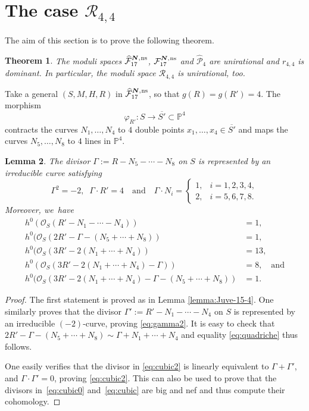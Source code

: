 \documentclass[JEP,XML,SOM,Unicode,NoEqCountersInSection,published]{cedram}
\newcommand{\quand}{\quad\text{and}\quad}
\newcommand{\ns}{{\mkern1mu\mathrm{ns}}}
\newcommand{\bN}{\boldsymbol{N}}
\theoremstyle{plain}
\newtheorem{thm}{Theorem}[section]
\newtheorem{lemma}[thm]{Lemma}
\theoremstyle{definition}
\newcommand\PP{{\mathbb P}}
\newcommand\F{{\mathcal F}}
\renewcommand\O{{\mathcal O}}
\renewcommand\P{{\mathcal P}}
\newcommand\R{{\mathcal R}}
\begin{document}
\section{The case \texorpdfstring{$\R_{4,4}$}{R}}

The aim of this section is to prove the following theorem.

\begin{thm}\label{thm:4,4}
The moduli spaces $\widehat{\F}_{17}^{\bN,\ns}$, $\F_{17}^{\bN,\ns}$ and $\widehat\P_{4}$ are unirational and $r_{4,4}$ is dominant. In particular, the moduli space $\R_{4,4}$ is unirational, too.
\end{thm}

Take a general $(S,M,H,R)$ in $\widehat{\F}_{17}^{\bN,\ns}$, so that $g(R)=g(R')=4$. The morphism
\[
\varphi_{R'}:S \to \overline{S'}\subset \PP^4
\]
contracts the curves $N_1,\ldots,N_4$ to $4$ double points $x_1,\ldots,x_4\in \overline{S'}$ and maps the curves \linebreak $N_5,\ldots,N_8$ to $4$ lines in $\PP^4$.

\begin{lemma} \label{lemma:Juve-15-3}
The divisor
$
\Gamma:=R-N_5-\cdots-N_8
$
on $S$ is represented by an irreducible curve satisfying
\[
 \Gamma^2=-2, \;\; \Gamma\cdot R'=4 \quand \Gamma \cdot N_i =
\begin{cases}
1, & i=1,2,3,4, \\
2, & i=5,6,7,8.
\end{cases}
\]
Moreover, we~have
\begin{align}
\label{eq:gamma2}
h^0(\O_S(R'-N_1-\cdots-N_4))&=1, \\
\label{eq:quadriche} h^0(\O_S(2R'-\Gamma-(N_5+\cdots+N_8))&=1,\\
\label{eq:cubic0} h^0(\O_S(3R'-2(N_1+\cdots+N_4))&=13,\\
\label{eq:cubic} h^0(\O_S(3R'-2(N_1+\cdots+N_4)-\Gamma))&=8,\quad\text{and} \\
\label{eq:cubic2} h^0(\O_S(3R'-2(N_1+\cdots+N_4)-\Gamma-(N_5+\cdots+N_8))&=1.
\end{align}
\end{lemma}

\begin{proof}
The first statement is proved as in Lemma \ref{lemma:Juve-15-4}. One similarly proves that the divisor
$
\Gamma':=R'-N_1-\cdots-N_4
$
on $S$ is represented by an irreducible $(-2)$-curve, proving \eqref{eq:gamma2}. It is easy to check that $2R'-\Gamma-(N_5+\cdots+N_8)\sim \Gamma+N_1+\cdots+N_4$ and equality \eqref{eq:quadriche} thus follows.

One easily verifies that the divisor in \eqref{eq:cubic2} is linearly equivalent to $\Gamma +\Gamma'$, and $\Gamma \cdot \Gamma'=0$, proving \eqref{eq:cubic2}.
This can also be used to prove that the divisors in~\eqref{eq:cubic0} and~\eqref{eq:cubic} are big and nef and thus compute their cohomology.
\end{proof}
\end{document}
